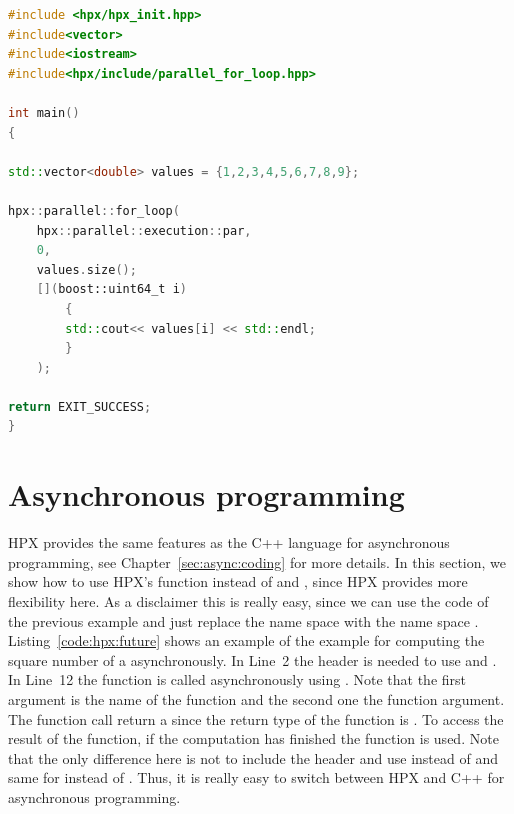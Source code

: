\documentclass[11pt,fleqn]{book} %
\begin{document}
\begin{lstlisting}[language=c++,caption={Parallel range-based for loops using HPX.\label{code:hpx:parallel:range:loop}},float,floatplacement=tb]
#include <hpx/hpx_init.hpp>
#include<vector>
#include<iostream>
#include<hpx/include/parallel_for_loop.hpp>

int main()
{

std::vector<double> values = {1,2,3,4,5,6,7,8,9};

hpx::parallel::for_loop(
	hpx::parallel::execution::par, 
	0, 
	values.size();
	[](boost::uint64_t i)
		{
		std::cout<< values[i] << std::endl;
		}
	);

return EXIT_SUCCESS;
}

\end{lstlisting}

\section{Asynchronous programming}
HPX provides the same features as the C++ language for asynchronous programming, see Chapter~\ref{sec:async:coding} for more details. In this section, we show how to use HPX's function instead of  and , since HPX provides more flexibility here. As a disclaimer this is really easy, since we can use the code of the previous example and just replace the name space  with the name space . Listing~\ref{code:hpx:future} shows an example of the example for computing the square number of a asynchronously. In Line~2 the header  is needed to use  and . In Line~12 the function  is called asynchronously using . Note that the first argument is the name of the function and the second one the function argument. The function call return a  since the return type of the function is . To access the result of the function, if the computation has finished the function  is used. Note that the only difference here is not to include the header  and use  instead of  and same for  instead of . Thus, it is really easy to switch between HPX and C++ for asynchronous programming.
\end{document}
